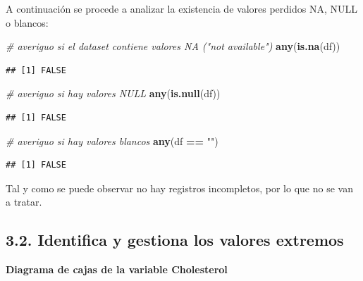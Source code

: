\documentclass[
]{article}
\newenvironment{Shaded}{\begin{snugshade}}{\end{snugshade}}
\newcommand{\AttributeTok}[1]{\textcolor[rgb]{0.13,0.29,0.53}{#1}}
\newcommand{\CommentTok}[1]{\textcolor[rgb]{0.56,0.35,0.01}{\textit{#1}}}
\newcommand{\FunctionTok}[1]{\textcolor[rgb]{0.13,0.29,0.53}{\textbf{#1}}}
\newcommand{\NormalTok}[1]{#1}
\newcommand{\SpecialCharTok}[1]{\textcolor[rgb]{0.81,0.36,0.00}{\textbf{#1}}}
\newcommand{\StringTok}[1]{\textcolor[rgb]{0.31,0.60,0.02}{#1}}
\begin{document}
A continuación se procede a analizar la existencia de valores perdidos
NA, NULL o blancos:

\begin{Shaded}
\begin{Highlighting}[]
\CommentTok{\# averiguo si el dataset contiene valores NA ("not available")}
\FunctionTok{any}\NormalTok{(}\FunctionTok{is.na}\NormalTok{(df))}
\end{Highlighting}
\end{Shaded}

\begin{verbatim}
## [1] FALSE
\end{verbatim}

\begin{Shaded}
\begin{Highlighting}[]
\CommentTok{\# averiguo si hay valores NULL}
\FunctionTok{any}\NormalTok{(}\FunctionTok{is.null}\NormalTok{(df))}
\end{Highlighting}
\end{Shaded}

\begin{verbatim}
## [1] FALSE
\end{verbatim}

\begin{Shaded}
\begin{Highlighting}[]
\CommentTok{\# averiguo si hay valores blancos}
\FunctionTok{any}\NormalTok{(df }\SpecialCharTok{==} \StringTok{""}\NormalTok{)}
\end{Highlighting}
\end{Shaded}

\begin{verbatim}
## [1] FALSE
\end{verbatim}

Tal y como se puede observar no hay registros incompletos, por lo que no
se van a tratar.

\hypertarget{identifica-y-gestiona-los-valores-extremos}{%
\subsection{3.2. Identifica y gestiona los valores
extremos}\label{identifica-y-gestiona-los-valores-extremos}}

\textbf{Diagrama de cajas de la variable Cholesterol}

\begin{Shaded}
\end{Shaded}
\end{document}
